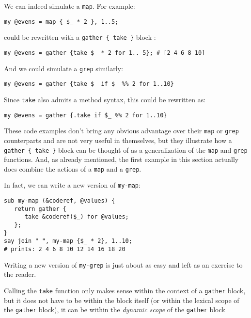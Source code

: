 We can indeed simulate a \verb'map'. For example:

\begin{verbatim}
my @evens = map { $_ * 2 }, 1..5;
\end{verbatim}

could be rewritten with a \verb'gather { take }' 
block :

\begin{verbatim}
my @evens = gather {take $_ * 2 for 1.. 5}; # [2 4 6 8 10]
\end{verbatim}

And we could simulate a {\tt grep} similarly:

\begin{verbatim}
my @evens = gather {take $_ if $_ %% 2 for 1..10}
\end{verbatim}

Since {\tt take} also admits a method syntax, this could 
be rewritten as:

\begin{verbatim}
my @evens = gather {.take if $_ %% 2 for 1..10}
\end{verbatim}


These code examples don't bring any obvious advantage 
over their \verb'map' or {\tt grep} counterparts and 
are not very useful in themselves, but they illustrate 
how a \verb'gather { take }' block can be thought 
of as a generalization of the \verb'map' and 
{\tt grep} functions. And, as already mentioned, 
the first example in this section actually does combine 
the actions of a {\tt map} and a {\tt grep}.

In fact, we can write a new version of {\tt my-map}:

\begin{verbatim}
sub my-map (&coderef, @values) {
   return gather {
      take &coderef($_) for @values;
   };
}
say join " ", my-map {$_ * 2}, 1..10;
# prints: 2 4 6 8 10 12 14 16 18 20
\end{verbatim}

Writing a new version of {\tt my-grep} is just 
about as easy and left as an exercise to the reader.

Calling the {\tt take} function only makes sense 
within the context of a \verb'gather' block, but 
it does not have to be within the block itself 
(or within the lexical scope of the \verb'gather' 
block), it can be within the \emph{dynamic scope} of the 
\verb'gather' block

